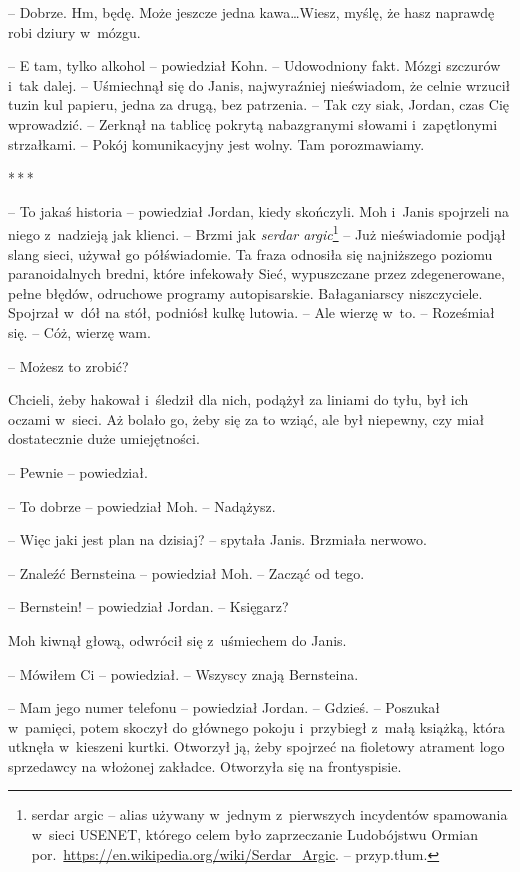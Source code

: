 \documentclass[oneside,polish,11pt,sfheadings]{mwbk}
\newcommand{\threeast}{\bigskip\par\centerline{*\,*\,*}\medskip\par}%
\begin{document}
-- Dobrze. Hm, będę. Może jeszcze jedna kawa\ldots Wiesz, myślę, że hasz
naprawdę robi dziury w~mózgu.

-- E tam, tylko alkohol -- powiedział Kohn. -- Udowodniony fakt. Mózgi
szczurów i~tak dalej. -- Uśmiechnął się do Janis, najwyraźniej
nieświadom, że celnie wrzucił tuzin kul papieru, jedna za drugą, bez
patrzenia. -- Tak czy siak, Jordan, czas Cię wprowadzić. -- Zerknął na
tablicę pokrytą nabazgranymi słowami i~zapętlonymi strzałkami. -- Pokój
komunikacyjny jest wolny. Tam porozmawiamy.
  \threeast 

-- To jakaś historia -- powiedział Jordan, kiedy skończyli. Moh i~Janis
spojrzeli na niego z~nadzieją jak klienci. -- Brzmi jak \emph{serdar
argic}\footnote{serdar argic -- alias używany w~jednym z~pierwszych incydentów
spamowania w~sieci USENET, którego celem było zaprzeczanie Ludobójstwu
Ormian por.~\url{https://en.wikipedia.org/wiki/Serdar\_Argic}.
-- przyp.tłum.} -- Już nieświadomie podjął slang sieci, używał go
półświadomie. Ta fraza odnosiła się najniższego poziomu paranoidalnych
bredni, które infekowały Sieć, wypuszczane przez zdegenerowane, pełne
błędów, odruchowe programy autopisarskie. Bałaganiarscy niszczyciele.
Spojrzał w~dół na stół, podniósł kulkę lutowia. -- Ale wierzę w~to. -- Roześmiał się. -- Cóż, wierzę wam.

-- Możesz to zrobić?

Chcieli, żeby hakował i~śledził dla nich, podążył za liniami do tyłu,
był ich oczami w~sieci. Aż bolało go, żeby się za to wziąć, ale był
niepewny, czy miał dostatecznie duże umiejętności.

-- Pewnie -- powiedział.

-- To dobrze -- powiedział Moh. -- Nadążysz.

-- Więc jaki jest plan na dzisiaj? -- spytała Janis. Brzmiała nerwowo.

-- Znaleźć Bernsteina -- powiedział Moh. -- Zacząć od tego.

-- Bernstein! -- powiedział Jordan. -- Księgarz?

Moh kiwnął głową, odwrócił się z~uśmiechem do Janis. 

-- Mówiłem Ci -- powiedział. -- Wszyscy znają Bernsteina.

-- Mam jego numer telefonu -- powiedział Jordan. -- Gdzieś. -- Poszukał w~pamięci, potem skoczył do głównego pokoju i~przybiegł z~małą książką,
która utknęła w~kieszeni kurtki. Otworzył ją, żeby spojrzeć na fioletowy
atrament logo sprzedawcy na włożonej zakładce. Otworzyła się na
frontyspisie.
\end{document}
